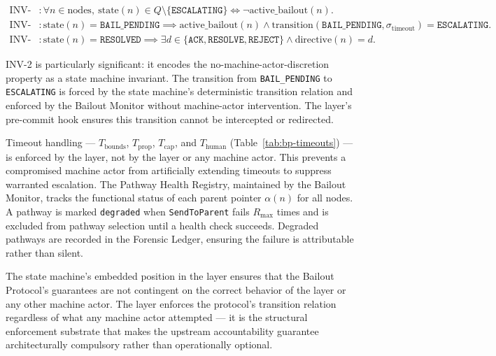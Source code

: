 \begin{align}
\text{INV-1}&: \forall n \in \text{nodes},\ \text{state}(n) \in Q \setminus \{\texttt{ESCALATING}\} \iff \neg\text{active\_bailout}(n). \tag{BP-INV-1} \\[4pt]
\text{INV-2}&: \text{state}(n) = \texttt{BAIL\_PENDING} \implies \text{active\_bailout}(n) \land \text{transition}(\texttt{BAIL\_PENDING}, \sigma_{\text{timeout}}) = \texttt{ESCALATING}. \tag{BP-INV-2} \\[4pt]
\text{INV-3}&: \text{state}(n) = \texttt{RESOLVED} \implies \exists d \in \{\texttt{ACK}, \texttt{RESOLVE}, \texttt{REJECT}\} \land \text{directive}(n) = d. \tag{BP-INV-3}
\end{align}

INV-2 is particularly significant: it encodes the no-machine-actor-discretion
property as a state machine invariant.  The transition from
\texttt{BAIL\_PENDING} to \texttt{ESCALATING} is forced by the state
machine's deterministic transition relation and enforced by the Bailout Monitor
without machine-actor intervention.  The \factLayer{} layer's pre-commit hook
ensures this transition cannot be intercepted or redirected.

Timeout handling --- $T_{\text{bounds}}$, $T_{\text{prop}}$, $T_{\text{cap}}$,
and $T_{\text{human}}$ (Table~\ref{tab:bp-timeouts}) --- is enforced by the
\factLayer{} layer, not by the \boundsLayer{} layer or any machine actor.  This prevents
a compromised machine actor from artificially extending timeouts to suppress
warranted escalation.  The Pathway Health Registry, maintained by the Bailout
Monitor, tracks the functional status of each parent pointer $\alpha(n)$ for
all nodes.  A pathway is marked \texttt{degraded} when \texttt{SendToParent}
fails $R_{\max}$ times and is excluded from pathway selection until a health
check succeeds.  Degraded pathways are recorded in the Forensic Ledger,
ensuring the failure is attributable rather than silent.

The state machine's embedded position in the \factLayer{} layer ensures that the
Bailout Protocol's guarantees are not contingent on the correct behavior of
the \boundsLayer{} layer or any other machine actor.  The \factLayer{} layer enforces
the protocol's transition relation regardless of what any machine actor
attempted --- it is the structural enforcement substrate that makes the
upstream accountability guarantee architecturally compulsory rather than
operationally optional.

